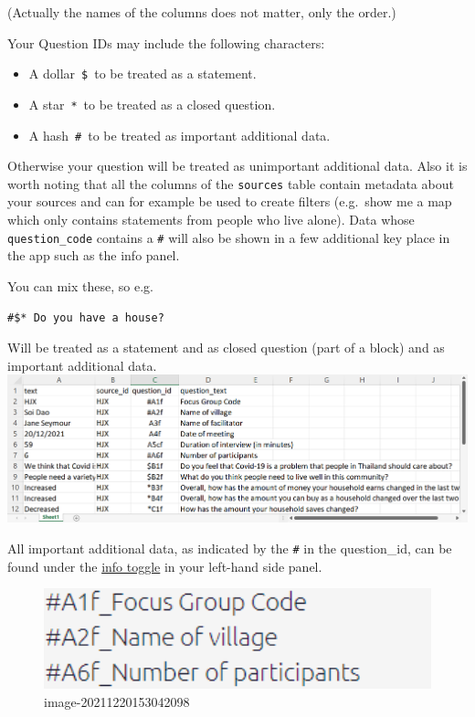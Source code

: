 \documentclass[
]{book}
\begin{document}
(Actually the names of the columns does not matter, only the order.)

Your Question IDs may include the following characters:

\begin{itemize}
\item
  A dollar~\texttt{\$}~to be treated as a statement.
\item
  A star~\texttt{*}~to be treated as a closed question.
\item
  A hash~\texttt{\#}~to be treated as important additional data.
\end{itemize}

Otherwise your question will be treated as unimportant additional data. Also it is worth noting that all the columns of the \texttt{sources} table contain metadata about your sources and can for example be used to create filters (e.g.~show me a map which only contains statements from people who live alone). Data whose \texttt{question\_code} contains a \texttt{\#} will also be shown in a few additional key place in the app such as the info panel.

You can mix these, so e.g.

\texttt{\#\$*\ Do\ you\ have\ a\ house?}

Will be treated as a statement and as closed question (part of a block) and as important additional data. \includegraphics[width=6.77083in,height=\textheight]{_assets/image-20211220160457936.png}

All important additional data, as indicated by the \texttt{\#} in the question\_id, can be found under the \protect\hyperlink{xadditional-information}{info toggle} in your left-hand side panel.

\begin{figure}
\centering
\includegraphics[width=6.77083in,height=\textheight]{_assets/image-20211220153042098.png}
\caption{image-20211220153042098}
\end{figure}
\end{document}
